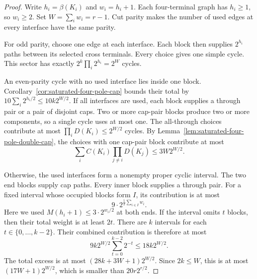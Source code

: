 \begin{proof}
Write $h_i=\beta(K_i)$ and $w_i=h_i+1$.
Each four-terminal graph has $h_i\ge1$, so $w_i\ge2$.
Set $W=\sum_i w_i=r-1$.
Cut parity makes the number of used edges at every interface have the same parity.

For odd parity, choose one edge at each interface.
Each block then supplies $2^{h_i}$ paths between its selected cross terminals.
Every choice gives one simple cycle.
This sector has exactly
$2^k\prod_i2^{h_i}=2^W$ cycles.

An even-parity cycle with no used interface lies inside one block.
Corollary~\ref{cor:saturated-four-pole-cap} bounds their total by
$10\sum_i2^{h_i/2}\le10k2^{W/2}$.
If all interfaces are used, each block supplies a through pair or a pair of disjoint caps.
Two or more cap-pair blocks produce two or more components, so a single cycle uses at most one.
The all-through choices contribute at most $\prod_iD(K_i)\le2^{W/2}$ cycles.
By Lemma~\ref{lem:saturated-four-pole-double-cap}, the choices with one cap-pair block contribute at most
\[
 \sum_i C(K_i)\prod_{j\ne i}D(K_j)
 \le3W2^{W/2}.
\]

Otherwise, the used interfaces form a nonempty proper cyclic interval.
The two end blocks supply cap paths.
Every inner block supplies a through pair.
For a fixed interval whose occupied blocks form $I$, its contribution is at most
\[
 9\cdot2^{\frac12\sum_{i\in I}w_i}.
\]
Here we used $M(h_i+1)\le3\cdot2^{w_i/2}$ at both ends.
If the interval omits $t$ blocks, then their total weight is at least $2t$.
There are $k$ intervals for each $t\in\{0,\ldots,k-2\}$.
Their combined contribution is therefore at most
\[
 9k2^{W/2}\sum_{t=0}^{k-2}2^{-t}
 \le18k2^{W/2}.
\]
The total excess is at most $(28k+3W+1)2^{W/2}$.
Since $2k\le W$, this is at most $(17W+1)2^{W/2}$,
which is smaller than $20r2^{r/2}$.
\end{proof}
